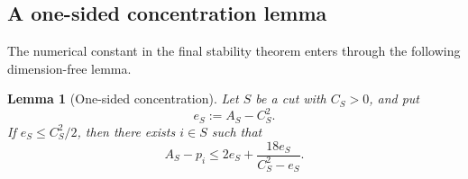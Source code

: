\documentclass[11pt]{article}
\newtheorem{lemma}[theorem]{Lemma}
\begin{document}
\subsection{A one-sided concentration lemma}

The numerical constant in the final stability theorem enters through the
following dimension-free lemma.

\begin{lemma}[One-sided concentration]\label{lem:onesided}
Let $S$ be a cut with $C_S>0$, and put
\[
  e_S:=A_S-C_S^2.
\]
If $e_S\le C_S^2/2$, then there exists $i\in S$ such that
\begin{equation}\label{eq:onesided}
  A_S-p_i
  \le
  2e_S+\frac{18e_S}{C_S^2-e_S}.
\end{equation}
\end{lemma}
\end{document}
